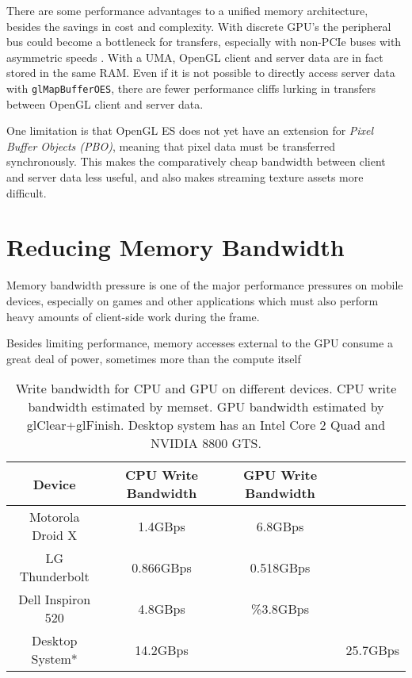There are some performance advantages to a unified memory architecture, besides
the savings in cost and complexity.  With discrete GPU's the peripheral bus
could become a bottleneck for transfers, especially with non-PCIe buses with
asymmetric speeds \cite{Elhasson05}.  With a UMA, OpenGL client and server data
are in fact stored in the same RAM.  Even if it is not possible to directly
access server data with \texttt{glMapBufferOES}, there are fewer performance
cliffs lurking in transfers between OpenGL client and server data.


One limitation is that OpenGL ES does not yet have an extension for
\textit{Pixel Buffer Objects (PBO)}, meaning that pixel data must be
transferred synchronously.  This makes the comparatively cheap bandwidth
between client and server data less useful, and also makes streaming texture
assets more difficult.

\section{Reducing Memory
Bandwidth}\label{Jon-McCaffrey:Reducing-Memory-Bandwidth}


Memory bandwidth pressure is one of the major performance pressures on mobile
devices, especially on games and other applications which must also perform
heavy amounts of client-side work during the frame.

Besides limiting performance, memory accesses external to the GPU consume a
great deal of power, sometimes more than the compute itself \cite{Antochi04}

\begin{table}[htb]\centering \begin{tabular}{|c|c|c|c|} 
\hline \small{Device} & \small{CPU Write Bandwidth} & \small{GPU Write Bandwidth}   \\ \hline 
\hline \small{Motorola Droid X} & \small{1.4GBps} & \small{6.8GBps} \\ 
\hline \small{LG Thunderbolt} & \small{0.866GBps} & \small{0.518GBps} \\ 
\hline \small{Dell Inspiron 520} & \small{4.8GBps} & \small{\%3.8GBps} \\ 
\hline \small{Desktop System*} & \small{14.2GBps} & \small{} & \small{25.7GBps}\\
\end{tabular} 
\caption{Write bandwidth for CPU and GPU on different devices.  CPU write bandwidth estimated by memset.  GPU bandwidth estimated by glClear+glFinish.  Desktop system has an Intel Core 2 Quad and NVIDIA 8800 GTS.}
\label{JonMcCaffrey:bandwidth} \end{table}

